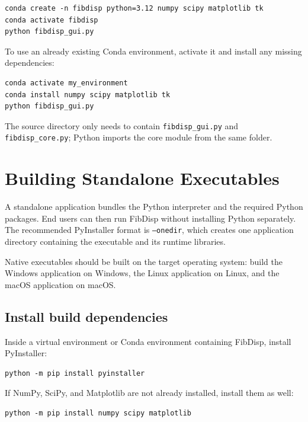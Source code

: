 \documentclass[11pt,a4paper]{article}
\begin{document}
\begin{lstlisting}
conda create -n fibdisp python=3.12 numpy scipy matplotlib tk
conda activate fibdisp
python fibdisp_gui.py
\end{lstlisting}

To use an already existing Conda environment, activate it and install any
missing dependencies:

\begin{lstlisting}
conda activate my_environment
conda install numpy scipy matplotlib tk
python fibdisp_gui.py
\end{lstlisting}

The source directory only needs to contain \texttt{fibdisp\_gui.py} and
\texttt{fibdisp\_core.py}; Python imports the core module from the same folder.

\section{Building Standalone Executables}

A standalone application bundles the Python interpreter and the required Python
packages. End users can then run FibDisp without installing Python separately.
The recommended PyInstaller format is \texttt{--onedir}, which creates one
application directory containing the executable and its runtime libraries.

Native executables should be built on the target operating system: build the
Windows application on Windows, the Linux application on Linux, and the macOS
application on macOS.

\subsection{Install build dependencies}

Inside a virtual environment or Conda environment containing FibDisp, install
PyInstaller:

\begin{lstlisting}
python -m pip install pyinstaller
\end{lstlisting}

If NumPy, SciPy, and Matplotlib are not already installed, install them as well:

\begin{lstlisting}
python -m pip install numpy scipy matplotlib
\end{lstlisting}
\end{document}
